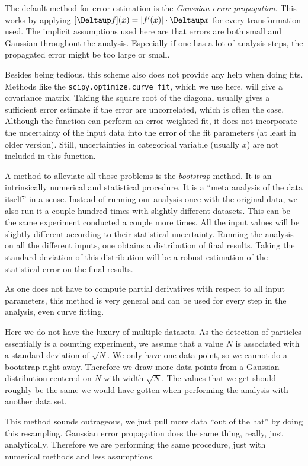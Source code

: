 \documentclass[11pt, english, fleqn, DIV=15, headinclude, BCOR=2cm]{scrreprt}
\begin{document}
The default method for error estimation is the \emph{Gaussian error
propagation}. This works by applying $[\Deltaup f](x) = |f'(x)| \cdot \Deltaup
x$ for every transformation used. The implicit assumptions used here are that
errors are both small and Gaussian throughout the analysis. Especially if one
has a lot of analysis steps, the propagated error might be too large or small.

Besides being tedious, this scheme also does not provide any help when doing
fits. Methods like the \texttt{scipy.optimize.curve\_fit}, which we use here,
will give a covariance matrix. Taking the square root of the diagonal usually
gives a sufficient error estimate if the error are uncorrelated, which is often
the case. Although the function can perform an error-weighted fit, it does not
incorporate the uncertainty of the input data into the error of the fit
parameters (at least in older version). Still, uncertainties in categorical
variable (usually $x$) are not included in this function.

A method to alleviate all those problems is the \emph{bootstrap} method. It is
an intrinsically numerical and statistical procedure. It is a \enquote{meta
analysis of the data itself} in a sense. Instead of running our analysis once
with the original data, we also run it a couple hundred times with slightly
different datasets. This can be the same experiment conducted a couple more
times. All the input values will be slightly different according to their
statistical uncertainty. Running the analysis on all the different inputs, one
obtains a distribution of final results. Taking the standard deviation of this
distribution will be a robust estimation of the statistical error on the final
results.

As one does not have to compute partial derivatives with respect to all input
parameters, this method is very general and can be used for every step in the
analysis, even curve fitting.

Here we do not have the luxury of multiple datasets. As the detection of
particles essentially is a counting experiment, we assume that a value $N$ is
associated with a standard deviation of $\sqrt N$. We only have one data point,
so we cannot do a bootstrap right away. Therefore we draw more data points from
a Gaussian distribution centered on $N$ with width $\sqrt N$. The values that
we get should roughly be the same we would have gotten when performing the
analysis with another data set.

This method sounds outrageous, we just pull more data \enquote{out of the hat}
by doing this resampling. Gaussian error propagation does the same thing,
really, just analytically. Therefore we are performing the same procedure, just
with numerical methods and less assumptions.
\end{document}
